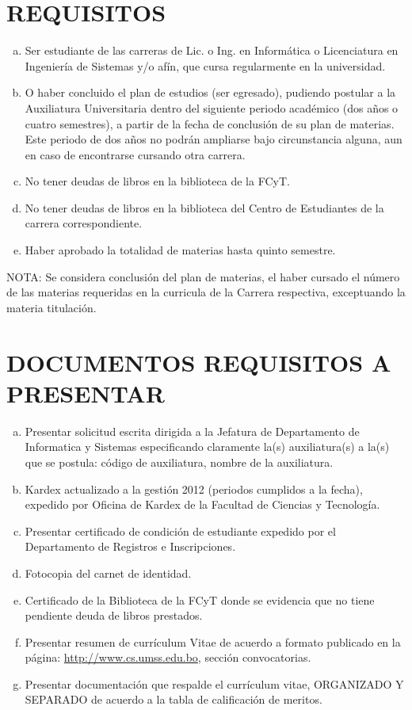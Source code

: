 \documentclass[letterpaper,11pt]{article}
\begin{document}
\section{REQUISITOS}
\begin{enumerate}[a)]
\item Ser estudiante de las carreras de Lic. o Ing. en Informática o Licenciatura en Ingeniería de Sistemas y/o afín, que cursa regularmente en la universidad.
\item O haber concluido el plan de estudios (ser egresado), pudiendo postular a la Auxiliatura Universitaria dentro del siguiente periodo académico (dos años o cuatro semestres), a partir de la fecha de conclusión de su plan de materias. Este periodo de dos años no podrán ampliarse bajo circunstancia alguna, aun en caso de encontrarse cursando otra carrera.
\item No tener deudas de libros en la biblioteca de la FCyT.
\item No tener deudas de libros en la biblioteca del Centro de Estudiantes de la carrera correspondiente.
\item Haber aprobado la totalidad de materias hasta quinto semestre.
\end{enumerate}

NOTA: Se considera conclusión del plan de materias, el haber cursado el número de las materias requeridas en la curricula de la Carrera respectiva, exceptuando la materia titulación.

\section{DOCUMENTOS REQUISITOS A PRESENTAR}
\begin{enumerate}[a)]
\item Presentar solicitud escrita dirigida a la Jefatura de Departamento de Informatica y Sistemas especificando claramente la(s) auxiliatura(s) a la(s) que se postula: código de auxiliatura, nombre de la auxiliatura.
\item Kardex actualizado a la gestión 2012 (periodos cumplidos a la fecha), expedido por Oficina de Kardex de la Facultad de Ciencias y Tecnología.
\item Presentar certificado de condición de estudiante expedido por el Departamento de Registros e Inscripciones.
\item Fotocopia del carnet de identidad.
\item Certificado de la Biblioteca de la FCyT donde se evidencia que no tiene pendiente deuda de libros prestados.
\item Presentar resumen de currículum Vitae de acuerdo a formato publicado en la página: \url{http://www.cs.umss.edu.bo}, sección convocatorias.
\item Presentar documentación que respalde el currículum vitae, ORGANIZADO Y SEPARADO de acuerdo a la tabla de calificación de meritos.
\end{enumerate}
\end{document}
